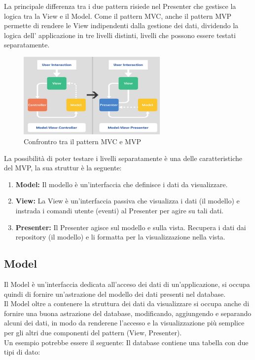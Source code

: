La principale differenza tra i due pattern risiede nel Presenter che gestisce la logica tra la View e il Model.
Come il pattern MVC, anche il pattern MVP permette di rendere le View indipendenti dalla gestione dei dati, dividendo la logica dell' applicazione in tre livelli distinti, livelli che possono essere testati separatamente.
\begin{figure}[!b]
     \centering
     \includegraphics[width=0.65\textwidth]{immagini/mvc-vs-mvp.jpg}
     \caption{Confrontro tra il pattern MVC e MVP}\label{fig:Confrontro tra il pattern MVC e MVP}
\end{figure}

\newpage
La possibilità di poter testare i livelli separatamente è una delle caratteristiche del MVP, la sua struttur è la seguente:\@
\begin{enumerate}
   \item \textbf{Model:} Il modello è un'interfaccia che definisce i dati da visualizzare.
   \item \textbf{View:} La View è un'interfaccia passiva che visualizza i dati (il modello) e instrada i comandi utente (eventi) al Presenter per agire su tali dati.
   \item \textbf{Presenter:} Il Presenter agisce sul modello e sulla vista. Recupera i dati dai repository (il modello) e li formatta per la visualizzazione nella vista.
\end{enumerate}




\subsection{Model}
Il Model è un'interfaccia dedicata all'acceso dei dati di un'applicazione, si occupa quindi di fornire un'astrazione del modello dei dati presenti nel database.\\
Il Model oltre a contenere la struttura dei dati da visualizzare si occupa anche di fornire una buona astrazione del database, modificando, aggiungendo e separando alcuni dei dati, in modo da renderene l'accesso e la visualizzazione più semplice per gli altri due componenti del pattern (View, Presenter).\\
Un esempio potrebbe essere il seguente:
Il database contiene una tabella con due tipi di dato:

